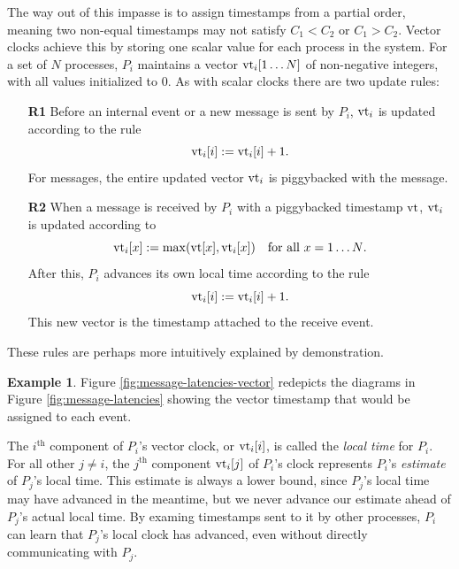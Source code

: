 \documentclass[]             %
{NASA}                       %
\theoremstyle{definition}
\newtheorem{example}{Example}[section]
\begin{document}
The way out of this impasse is to assign timestamps from a partial
order, meaning two non-equal timestamps may not satisfy $C_1 < C_2$ or
$C_1 > C_2$. Vector clocks achieve this by storing one scalar value
for each process in the system. For a set of $N$ processes, $P_i$
maintains a vector $\textrm{vt}_i[1 \ldots N]$ of non-negative integers, with
all values initialized to $0$. As with scalar clocks there
are two update rules:
\begin{enumerate}
\item[\textbf{R1}] Before an internal event or a new message is sent by $P_i$,
  $\textrm{vt}_i$ is updated according to the rule
  \[\textrm{vt}_i[i] := \textrm{vt}_i[i] + 1.\]
  For messages, the entire updated vector $\textrm{vt}_i$ is piggybacked with
  the message.
\item[\textbf{R2}] When a message is received by $P_i$ with a
  piggybacked timestamp $\textrm{vt}$, $\textrm{vt}_i$ is updated according to
  \[\textrm{vt}_i[x] := \max(\textrm{vt}[x], \textrm{vt}_i[x]) \quad \textrm{for all $x = 1\ldots N$}.\]
  After this, $P_i$ advances its own local time according to the rule
  \[ \textrm{vt}_i[i] := \textrm{vt}_i[i] + 1.\]
  This new vector is the timestamp attached to the receive event.
\end{enumerate}

These rules are perhaps more intuitively explained by demonstration.

\begin{example}
Figure \ref{fig:message-latencies-vector} redepicts the diagrams in
Figure \ref{fig:message-latencies} showing the vector timestamp that
would be assigned to each event.
\end{example}

The $i^\textrm{th}$ component of $P_i$'s vector clock, or $\textrm{vt}_i[i]$,
is called the \emph{local time} for $P_i$. For all other $j \neq i$,
the $j^\textrm{th}$ component $\textrm{vt}_i[j]$ of $P_i$'s clock represents
$P_i$'s \emph{estimate} of $P_j$'s local time. This estimate is always
a lower bound, since $P_j$'s local time may have advanced in the
meantime, but we never advance our estimate ahead of $P_j$'s actual
local time. By examing timestamps sent to it by other processes, $P_i$
can learn that $P_j$'s local clock has advanced, even without directly
communicating with $P_j$.
\end{document}

